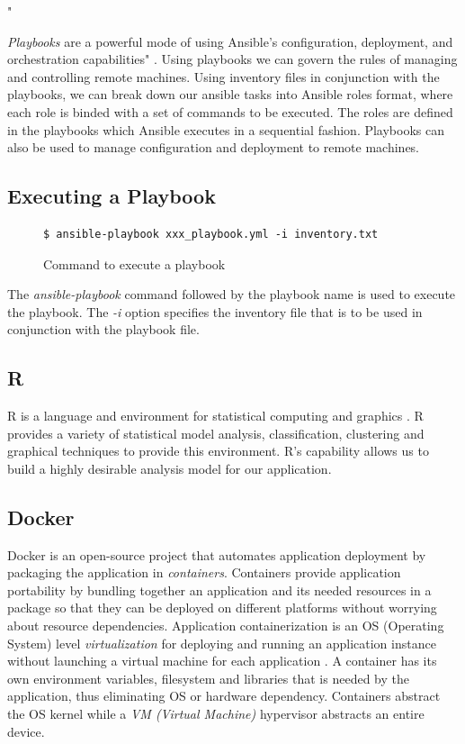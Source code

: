 \documentclass[9pt,twocolumn,twoside]{../../styles/osajnl}
\begin{document}
"{\emph{Playbooks} are a powerful mode of using Ansible’s
  configuration, deployment, and orchestration capabilities"
\cite{www-ansible-playbook}. Using playbooks we can govern the rules
of managing and controlling remote machines. Using inventory files in
conjunction with the playbooks, we can break down our ansible tasks
into Ansible roles format, where each role is binded with a set of
commands to be executed. The roles are defined in the playbooks which
Ansible executes in a sequential fashion. Playbooks can also be used
to manage configuration and deployment to remote machines.

\subsection{Executing a Playbook}
\begin{figure}[H]
\begin{verbatim}
$ ansible-playbook xxx_playbook.yml -i inventory.txt
\end{verbatim}
\caption{Command to execute a playbook}
\vspace{-4mm}
\label{Command to execute a playbook}
\end{figure}

\noindent
The \emph{ansible-playbook} command followed by the playbook name is
used to execute the playbook. The \emph{-i} option specifies the
inventory file that is to be used in conjunction with the playbook
file.

\subsection{R}
R is a language and environment for statistical computing and graphics
\cite{www-about-rproject}. R provides a variety of statistical model
analysis, classification, clustering and graphical techniques to
provide this environment. R's capability allows us to build a highly
desirable analysis model for our application.


\subsection{Docker}

Docker is an open-source project that automates application deployment
by packaging the application in \emph{containers}. Containers provide
application portability by bundling together an application and its
needed resources in a package so that they can be deployed on
different platforms without worrying about resource
dependencies. Application containerization is an OS (Operating System)
level \emph{virtualization} \cite{www-virtualization-wiki} for
deploying and running an application instance without launching a
virtual machine for each application \cite{www-containerization}. A
container has its own environment variables, filesystem and libraries
that is needed by the application, thus eliminating OS or hardware
dependency. Containers abstract the OS kernel while a \emph{VM
  (Virtual Machine)} \cite{www-virtualmachine-wiki} hypervisor
abstracts an entire device.

}
\end{document}
